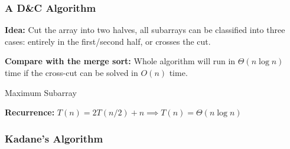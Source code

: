 \documentclass[10pt]{article}
\begin{document}
\newpage

\subsubsection{A D\&C Algorithm}

\textbf{Idea:} Cut the array into two halves, all subarrays can be classified into three cases: entirely in the first/second half, or crosses the cut.

\textbf{Compare with the merge sort:} Whole algorithm will run in $\Theta(n\log n)$ time if the cross-cut can be solved in $O(n)$ time.

\begin{algorithm}
	\SetAlgoLined
	\caption{Maximum Subarray}
\end{algorithm}

\textbf{Recurrence:} $T(n) = 2T(n/2)+n \implies T(n) = \Theta(n\log n)$

\subsubsection{Kadane's Algorithm}
\end{document}
